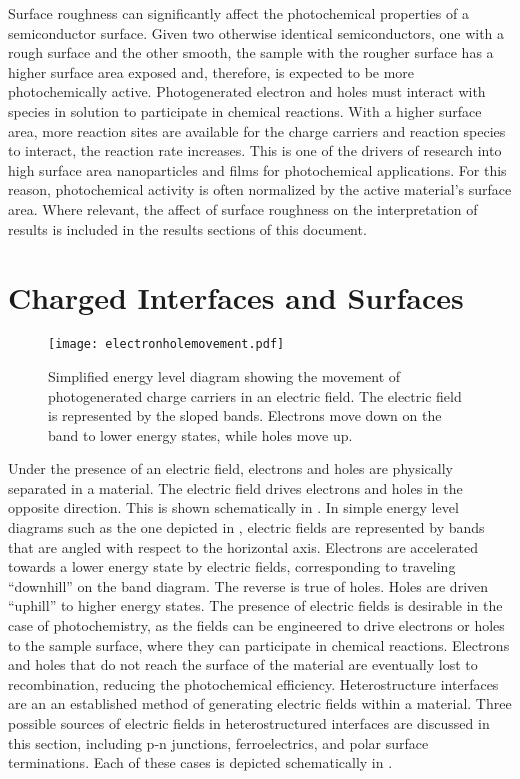 Surface roughness can significantly affect the photochemical properties of 
a semiconductor surface. Given two otherwise identical semiconductors, one 
with a rough surface and the other smooth, the sample with the rougher 
surface has a higher surface area exposed and, therefore, is expected to be 
more photochemically active. Photogenerated electron and holes must 
interact with species in solution to participate in chemical reactions. 
With a higher surface area, more reaction sites are available for the 
charge carriers and reaction species to interact, the reaction rate 
increases. This is one of the drivers of research into high surface area 
nanoparticles and films for photochemical applications.\cite{Kudo:2008fk} 
For this reason, photochemical activity is often normalized by the active 
material's surface area. Where relevant, the affect of surface roughness on 
the interpretation of results is included in the results sections of this
document.


\section{Charged Interfaces and Surfaces}
\label{sec:background.charged}


\begin{figure}
	\centering
	\texttt{[image: electronholemovement.pdf]}
	\caption[Movement of photogenerated charge carriers]{%
		Simplified energy level diagram showing the movement of 
		photogenerated charge carriers in an electric field. The electric 
		field is represented by the sloped bands. Electrons move down on 
		the band to lower energy states, while holes move up.}
	\label{fig:electronholemovement}
\end{figure}
Under the presence of an electric field, electrons and holes are physically separated in a material. The electric field drives electrons and holes in the opposite direction. This is shown schematically in . In simple energy level diagrams such as the one depicted in , electric fields are represented by bands that are angled with respect to the horizontal axis. Electrons are accelerated towards a lower energy state by electric fields, corresponding to traveling ``downhill'' on the band diagram. The reverse is true of holes. Holes are driven ``uphill'' to higher energy states. The presence of electric fields is desirable in the case of photochemistry, as the fields can be engineered to drive electrons or holes to the sample surface, where they can participate in chemical reactions. Electrons and holes that do not reach the surface of the material are eventually lost to recombination, reducing the photochemical efficiency. Heterostructure interfaces are an an established method of generating electric fields within a material. Three possible sources of electric fields in heterostructured interfaces are discussed in this section, including p-n junctions, ferroelectrics, and polar surface terminations. Each of these cases is depicted schematically in . 

